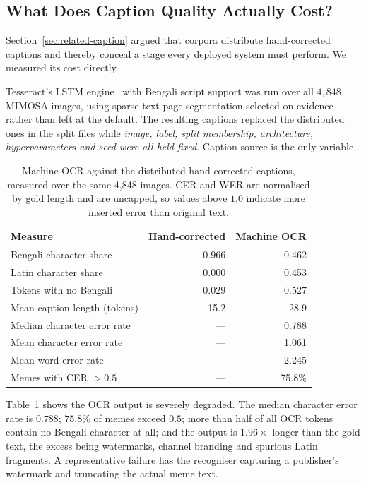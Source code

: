\documentclass[conference]{IEEEtran}
\begin{document}
\subsection{What Does Caption Quality Actually Cost?}
\label{sec:abl-caption}

Section~\ref{sec:related-caption} argued that corpora distribute hand-corrected
captions and thereby conceal a stage every deployed system must perform. We
measured its cost directly.

Tesseract's LSTM engine~\cite{smith2007} with Bengali script support was run
over all $4{,}848$ MIMOSA images, using sparse-text page segmentation selected
on evidence rather than left at the default. The resulting captions replaced the
distributed ones in the split files while \emph{image, label, split membership,
architecture, hyperparameters and seed were all held fixed}. Caption source is
the only variable.

\begin{table}[t]
\caption{Machine OCR against the distributed hand-corrected captions, measured
over the same 4{,}848 images. CER and WER are normalised by gold length and are
uncapped, so values above $1.0$ indicate more inserted error than original text.}
\label{tab:caption-quality}
\centering
\footnotesize
\begin{tabular}{lrr}
\toprule
Measure & Hand-corrected & Machine OCR \\
\midrule
Bengali character share      & 0.966 & 0.462 \\
Latin character share        & 0.000 & 0.453 \\
Tokens with no Bengali       & 0.029 & 0.527 \\
Mean caption length (tokens) & 15.2  & 28.9 \\
\midrule
Median character error rate  & ---   & 0.788 \\
Mean character error rate    & ---   & 1.061 \\
Mean word error rate         & ---   & 2.245 \\
Memes with CER $>0.5$        & ---   & 75.8\% \\
\bottomrule
\end{tabular}
\end{table}

Table~\ref{tab:caption-quality} shows the OCR output is severely degraded. The
median character error rate is $0.788$; $75.8\%$ of memes exceed $0.5$; more
than half of all OCR tokens contain no Bengali character at all; and the output
is $1.96\times$ longer than the gold text, the excess being watermarks, channel
branding and spurious Latin fragments. A representative failure has the
recogniser capturing a publisher's watermark and truncating the actual meme
text.
\end{document}
